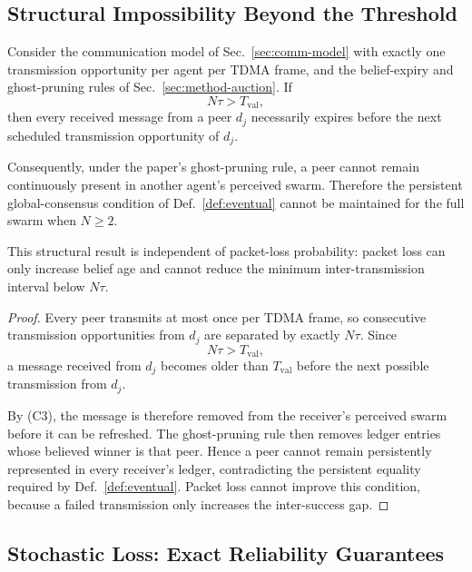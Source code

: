 \subsection{Structural Impossibility Beyond the Threshold}\label{sec:phase-transition}

\begin{theorem}
\label{thm:impossibility}
Consider the communication model of Sec.~\ref{sec:comm-model}
with exactly one transmission opportunity per agent per TDMA frame,
and the belief-expiry and ghost-pruning rules of
Sec.~\ref{sec:method-auction}. If
\[
N\tau>T_{\mathrm{val}},
\]
then every received message from a peer $d_j$ necessarily expires
before the next scheduled transmission opportunity of $d_j$.

Consequently, under the paper's ghost-pruning rule, a peer cannot
remain continuously present in another agent's perceived swarm.
Therefore the persistent global-consensus condition of
Def.~\ref{def:eventual} cannot be maintained for the full swarm
when $N\geq2$.

This structural result is independent of packet-loss probability:
packet loss can only increase belief age and cannot reduce the
minimum inter-transmission interval below $N\tau$.
\end{theorem}

\begin{proof}
Every peer transmits at most once per TDMA frame, so consecutive
transmission opportunities from $d_j$ are separated by exactly
$N\tau$. Since
\[
N\tau>T_{\mathrm{val}},
\]
a message received from $d_j$ becomes older than
$T_{\mathrm{val}}$ before the next possible transmission from
$d_j$.

By (C3), the message is therefore removed from the receiver's
perceived swarm before it can be refreshed. The ghost-pruning rule
then removes ledger entries whose believed winner is that peer. Hence a peer cannot remain persistently represented in every
receiver's ledger, contradicting the persistent equality required
by Def.~\ref{def:eventual}. Packet loss cannot improve this condition,
because a failed transmission only increases the inter-success gap.
\end{proof}

\subsection{Stochastic Loss: Exact Reliability Guarantees}\label{sec:theory-stoch}

